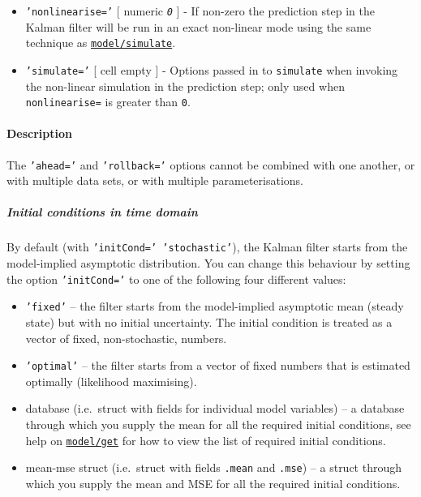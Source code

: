 \begin{itemize}
\item
  \texttt{'nonlinearise='} {[} numeric \textbar{} \emph{\texttt{0}} {]}
  - If non-zero the prediction step in the Kalman filter will be run in
  an exact non-linear mode using the same technique as
  \href{model/simulate}{\texttt{model/simulate}}.
\item
  \texttt{'simulate='} {[} cell \textbar{} empty {]} - Options passed in
  to \texttt{simulate} when invoking the non-linear simulation in the
  prediction step; only used when \texttt{nonlinearise=} is greater than
  \texttt{0}.
\end{itemize}

\paragraph{Description}

The \texttt{'ahead='} and \texttt{'rollback='} options cannot be
combined with one another, or with multiple data sets, or with multiple
parameterisations.

\subparagraph{Initial conditions in time
domain}

By default (with \texttt{'initCond=' 'stochastic'}), the Kalman filter
starts from the model-implied asymptotic distribution. You can change
this behaviour by setting the option \texttt{'initCond='} to one of the
following four different values:

\begin{itemize}
\item
  \texttt{'fixed'} -- the filter starts from the model-implied
  asymptotic mean (steady state) but with no initial uncertainty. The
  initial condition is treated as a vector of fixed, non-stochastic,
  numbers.
\item
  \texttt{'optimal'} -- the filter starts from a vector of fixed numbers
  that is estimated optimally (likelihood maximising).
\item
  database (i.e.~struct with fields for individual model variables) -- a
  database through which you supply the mean for all the required
  initial conditions, see help on \href{model/get}{\texttt{model/get}}
  for how to view the list of required initial conditions.
\item
  mean-mse struct (i.e.~struct with fields \texttt{.mean} and
  \texttt{.mse}) -- a struct through which you supply the mean and MSE
  for all the required initial conditions.
\end{itemize}

